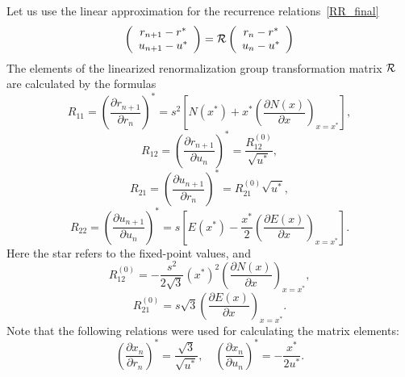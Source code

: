 Let us use the linear approximation for the recurrence relations~\eqref{RR_final}
\begin{equation}
	\label{eq:linear_rr}
	\left(
		\begin{array}{c}
			r_{n+1} - r^* \\
			u_{n+1} - u^*
		\end{array}
	\right)
	= \cal{R}
	\left(
		\begin{array}{c}
			r_{n} - r^* \\
			u_{n} - u^*
		\end{array}
	\right)
\end{equation}
The elements of the linearized renormalization group transformation matrix $\cal{R}$ are calculated by the formulas
\begin{equation*}
	R_{11} = \left(\frac{\partial r_{n+1}}{\partial r_n}\right)^* = s^2 \left[N(x^*) + x^* \left(\frac{\partial N(x)}{\partial x} \right)_{x=x^*} \right],
\end{equation*}
\begin{equation*}
	R_{12} = \left(\frac{\partial r_{n+1}}{\partial u_n}\right)^* = \frac{R_{12}^{(0)}}{\sqrt{u^*}},
\end{equation*}
\begin{equation*}
	R_{21} = \left(\frac{\partial u_{n+1}}{\partial r_n}\right)^* = R_{21}^{(0)} \sqrt{u^*},
\end{equation*}
\begin{equation*}
	R_{22} = \left(\frac{\partial u_{n+1}}{\partial u_n}\right)^* = s \left[E(x^*) - \frac{x^*}{2} \left(\frac{\partial E(x)}{\partial x}\right)_{x=x^*}\right].
\end{equation*}
Here the star refers to the fixed-point values, and
\begin{equation*}
	R_{12}^{(0)} = -\frac{s^2}{2\sqrt{3}} (x^*)^2 \left(\frac{\partial N(x)}{\partial x} \right)_{x=x^*},
\end{equation*}
\begin{equation*}
	R_{21}^{(0)} = s\sqrt{3} \left(\frac{\partial E(x)}{\partial x}\right)_{x=x^*}.
\end{equation*}
Note that the following relations were used for calculating the matrix elements:
\begin{equation*}
	\left(\frac{\partial x_n}{\partial r_n}\right)^* = \frac{\sqrt{3}}{\sqrt{u^*}}, 
	\quad
	\left(\frac{\partial x_n}{\partial u_n}\right)^* = - \frac{x^*}{2u^*}.
\end{equation*}

